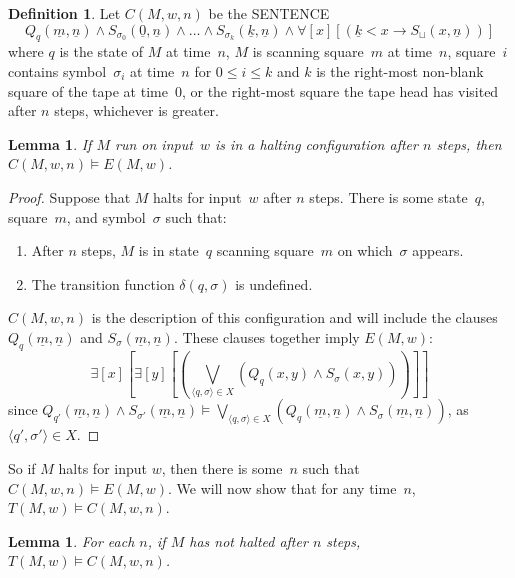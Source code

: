 \documentclass[10pt,a4paper]{article}
\newcommand*{\olup}[1]{\MakeUppercase{#1}}
\theoremstyle{plain}
\newtheorem{lem}[thm]{Lemma}
\theoremstyle{definition}
\newtheorem{defn}[thm]{Definition}
\theoremstyle{remark}
\newenvironment{explain}{}{}
\newcommand*{\ollabel}[1]{\label{#1}}
\providecommand{\lif}{\mathbin{\rightarrow}}
\providecommand{\lforall}{\mathord{\forall}}
\providecommand{\lexists}{\mathord{\exists}}
\providecommand{\Entails}{\mathrel{\models}}
\providecommand{\Obj}{}
\providecommand{\tuple}[1]{\langle #1 \rangle}
\providecommand{\num}[1]{\underline{#1}}
\providecommand{\TMblank}{\sqcup}
\begin{document}
\begin{defn} 
Let $C(M, w, n)$ be the \olup{sentence}
\[ 
\Obj Q_q(\num{m}, \num{n}) \land \Obj S_{\sigma_0}(\num{0}, \num{n})
\land \dots \land \Obj S_{\sigma_k}(\num{k}, \num{n}) \land
\lforall[x][(\num{k} < x \lif \Obj S_\TMblank(x, \num{n}))]
\] 
where $q$ is the state of $M$ at time~$n$, $M$ is scanning square~$m$
at time~$n$, square~$i$ contains symbol~$\sigma_i$ at time~$n$ for $0
\le i \le k$ and $k$ is the right-most non-blank square of the tape at
time~$0$, or the right-most square the tape head has visited after $n$
steps, whichever is greater.
\end{defn}

\begin{lem}\ollabel{lem:halt-config-implies-halt}
If $M$ run on input~$w$ is in a halting configuration after $n$ steps,
then $C(M, w, n) \Entails E(M, w)$.
\end{lem}

\begin{proof}
Suppose that $M$ halts for input~$w$ after $n$ steps.
There is some state~$q$, square~$m$, and symbol~$\sigma$ such that:
\begin{enumerate} 
\item After $n$ steps, $M$ is in state~$q$ scanning square~$m$ on
  which~$\sigma$ appears.
\item The transition function $\delta(q, \sigma)$ is undefined.
\end{enumerate}
$C(M, w, n)$ is the description of this configuration and will
include the clauses $\Obj Q_{q}(\num{m}, \num{n})$ and $\Obj
S_{\sigma}(\num{m}, \num{n})$. These clauses together imply $E(M,
w)$:
\[
\lexists[x][\lexists[y][(\bigvee_{\tuple{q, \sigma} \in
      X}(\Obj Q_q(x, y) \land \Obj S_\sigma(x, y)))]]
\]
since $\Obj Q_{q'}(\num{m}, \num{n}) \land S_{\sigma'}(\num{m},
\num{n}) \Entails \bigvee_{\tuple{q, \sigma} \in X} (\Obj Q_q(\num{m},
\num{n}) \land \Obj S_{\sigma}(\num{m}, \num{n}))$, as
$\tuple{q',\sigma'} \in X$. 
\end{proof}

\begin{explain}
So if $M$ halts for input $w$, then there is some~$n$ such that $C(M,
w, n) \Entails E(M,w)$.  We will now show that for any time~$n$,
$T(M, w) \Entails C(M, w, n)$.
\end{explain}

\begin{lem}
\ollabel{lem:config}
For each $n$, if $M$ has not halted after $n$ steps, $T(M, w)
\Entails C(M, w, n)$.
\end{lem}
\end{document}
